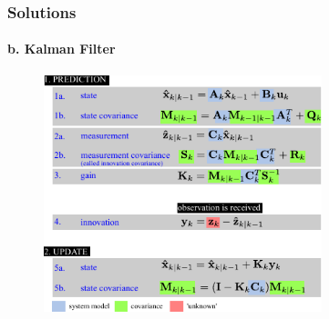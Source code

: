 \begin{frame}
\frametitle{Solutions}
\framesubtitle{b. Kalman Filter}
\mypagenum
\begin{figure}
\includegraphics[width=0.72\textwidth]{figs/TRK_KalmanFilter_equations2.pdf}
\end{figure}
\end{frame}



%
%
%






